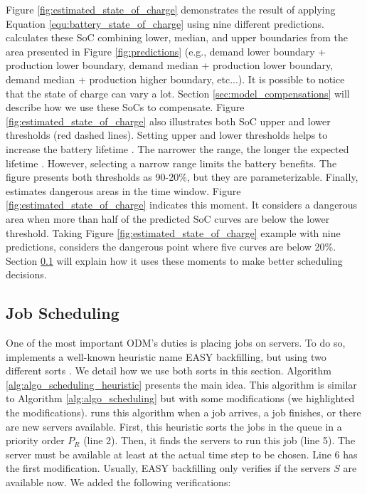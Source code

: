 Figure \ref{fig:estimated_state_of_charge} demonstrates the result of applying Equation \ref{equ:battery_state_of_charge} using nine different predictions. \emph{\systemName} calculates these SoC combining lower, median, and upper boundaries from the area presented in Figure \ref{fig:predictions} (e.g., demand lower boundary + production lower boundary, demand median + production lower boundary, demand median + production higher boundary, etc...). It is possible to notice that the state of charge can vary a lot. Section \ref{sec:model_compensations} will describe how we use these SoCs to compensate. Figure \ref{fig:estimated_state_of_charge} also illustrates both SoC upper and lower thresholds (red dashed lines). Setting upper and lower thresholds helps to increase the battery lifetime \cite{xu2016modeling}. The narrower the range, the longer the expected lifetime \cite{xu2016modeling}. However, selecting a narrow range limits the battery benefits. The figure presents both thresholds as 90-20\%, but they are parameterizable. Finally, \emph{\systemName} estimates dangerous areas in the time window. Figure \ref{fig:estimated_state_of_charge} indicates this moment. It considers a dangerous area when more than half of the predicted SoC curves are below the lower threshold. Taking Figure \ref{fig:estimated_state_of_charge} example with nine predictions, \emph{\systemName} considers the dangerous point where five curves are below 20\%. Section \ref{sec:model_easy} will explain how it uses these moments to make better scheduling decisions.


\subsection{Job Scheduling}
\label{sec:model_easy}

One of the most important ODM's duties is placing jobs on servers. To do so, \emph{\systemName} implements a well-known heuristic name EASY backfilling, but using two different sorts \cite{mu2001utilization, lelong2018tuning}. We detail how we use both sorts in this section. Algorithm \ref{alg:algo_scheduling_heuristic} presents the main idea. This algorithm is similar to Algorithm \ref{alg:algo_scheduling} but with some modifications (we highlighted the modifications). \emph{\systemName} runs this algorithm when a job arrives, a job finishes, or there are new servers available. First, this heuristic sorts the jobs in the queue in a priority order $P_{R}$ (line 2). Then, it finds the servers to run this job (line 5). The server must be available at least at the actual time step to be chosen. Line 6 has the first modification. Usually, EASY backfilling only verifies if the servers $S$ are available now. We added the following verifications:

